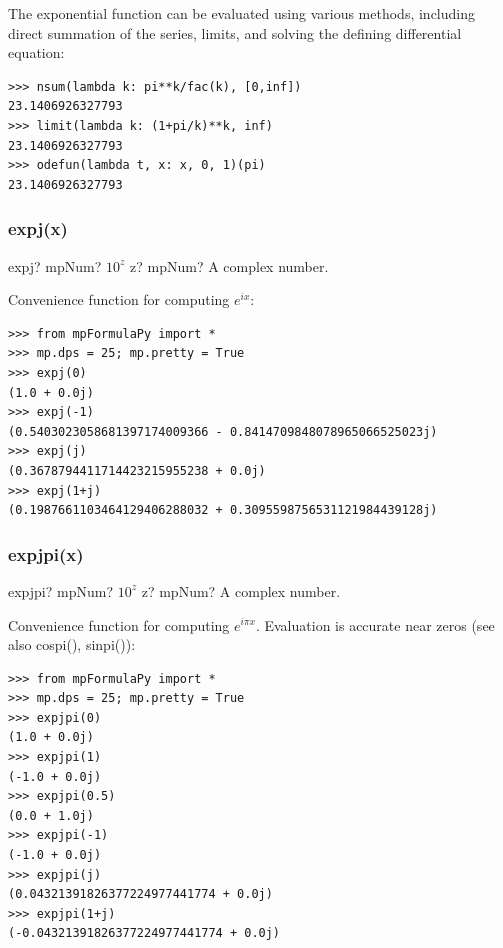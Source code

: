 The exponential function can be evaluated using various methods, including direct
summation of the series, limits, and solving the defining differential equation:
\begin{lstlisting}
>>> nsum(lambda k: pi**k/fac(k), [0,inf])
23.1406926327793
>>> limit(lambda k: (1+pi/k)**k, inf)
23.1406926327793
>>> odefun(lambda t, x: x, 0, 1)(pi)
23.1406926327793
\end{lstlisting}




\subsubsection{expj(x)}

\begin{mpFunctionsExtract}
	\mpFunctionOne
	{expj? mpNum?  $10^z$}
	{z? mpNum? A complex number.}
\end{mpFunctionsExtract}


Convenience function for computing $e^{ix}$:
\begin{lstlisting}
>>> from mpFormulaPy import *
>>> mp.dps = 25; mp.pretty = True
>>> expj(0)
(1.0 + 0.0j)
>>> expj(-1)
(0.5403023058681397174009366 - 0.8414709848078965066525023j)
>>> expj(j)
(0.3678794411714423215955238 + 0.0j)
>>> expj(1+j)
(0.1987661103464129406288032 + 0.3095598756531121984439128j)
\end{lstlisting}



\subsubsection{expjpi(x)}


\begin{mpFunctionsExtract}
	\mpFunctionOne
	{expjpi? mpNum?  $10^z$}
	{z? mpNum? A complex number.}
\end{mpFunctionsExtract}


Convenience function for computing $e^{i \pi x}$. Evaluation is accurate near zeros (see also cospi(), sinpi()):
\begin{lstlisting}
>>> from mpFormulaPy import *
>>> mp.dps = 25; mp.pretty = True
>>> expjpi(0)
(1.0 + 0.0j)
>>> expjpi(1)
(-1.0 + 0.0j)
>>> expjpi(0.5)
(0.0 + 1.0j)
>>> expjpi(-1)
(-1.0 + 0.0j)
>>> expjpi(j)
(0.04321391826377224977441774 + 0.0j)
>>> expjpi(1+j)
(-0.04321391826377224977441774 + 0.0j)
\end{lstlisting}




